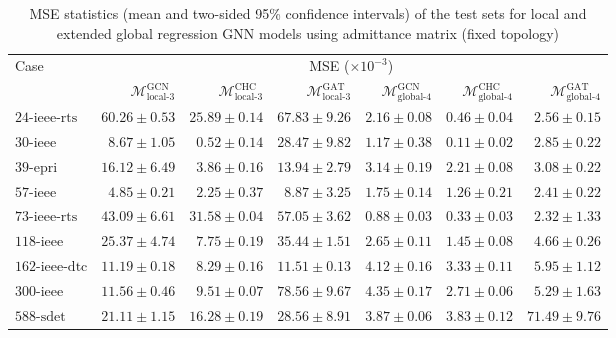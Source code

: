 \documentclass[journal]{IEEEtran}
\begin{document}
\begin{table*}[!ht]
\small
\caption{MSE statistics (mean and two-sided 95\% confidence intervals) of the test sets for local and extended global regression GNN models using admittance matrix (fixed topology)}
\label{tab:error_reg_local_admittance}
\def\na{---}
\centering
    \begin{tabular}{lrrr|rrr}
    \toprule
    \multirow{2}{*}{Case} & \multicolumn{6}{c}{MSE ($\times 10^{-3}$)} \\
    \cmidrule(r){2-7}
    & $\mathcal{M}^{\textrm{GCN}}_{\textrm{local-3}}$ & $\mathcal{M}^{\textrm{CHC}}_{\textrm{local-3}}$ & $\mathcal{M}^{\textrm{GAT}}_{\textrm{local-3}}$ & $\mathcal{M}^{\textrm{GCN}}_{\textrm{global-4}}$ & $\mathcal{M}^{\textrm{CHC}}_{\textrm{global-4}}$ & $\mathcal{M}^{\textrm{GAT}}_{\textrm{global-4}}$ \\
    \midrule
    $\textrm{24-ieee-rts}$ & $60.26 \pm 0.53$ & $25.89 \pm 0.14$ & $67.83 \pm 9.26$ & $2.16 \pm 0.08$ & $0.46 \pm 0.04$ & $2.56 \pm 0.15$ \\
    $\textrm{30-ieee}$ & $8.67 \pm 1.05$ & $0.52 \pm 0.14$ & $28.47 \pm 9.82$ & $1.17 \pm 0.38$ & $0.11 \pm 0.02$ & $2.85 \pm 0.22$ \\
    $\textrm{39-epri}$ &$16.12 \pm 6.49$ & $3.86 \pm 0.16$ & $13.94 \pm 2.79$ & $3.14 \pm 0.19$ & $2.21 \pm 0.08$ & $3.08 \pm 0.22$ \\
    $\textrm{57-ieee}$ & $4.85 \pm 0.21$ & $2.25 \pm 0.37$ & $8.87 \pm 3.25$ & $1.75 \pm 0.14$ & $1.26 \pm 0.21$ & $2.41 \pm 0.22$ \\
    $\textrm{73-ieee-rts}$ & $43.09 \pm 6.61$ & $31.58 \pm 0.04$ & $57.05 \pm 3.62$ & $0.88 \pm 0.03$ & $0.33 \pm 0.03$ & $2.32 \pm 1.33$ \\
    $\textrm{118-ieee}$ & $25.37 \pm 4.74$ & $7.75 \pm 0.19$ & $35.44 \pm 1.51$ & $2.65 \pm 0.11$ & $1.45 \pm 0.08$ & $4.66 \pm 0.26$\\
    $\textrm{162-ieee-dtc}$ & $11.19 \pm 0.18$ & $8.29 \pm 0.16$ & $11.51 \pm 0.13$ & $4.12 \pm 0.16$ & $3.33 \pm 0.11$ & $5.95 \pm 1.12$ \\
    $\textrm{300-ieee}$ & $11.56 \pm 0.46$ & $9.51 \pm 0.07$ & $78.56 \pm 9.67$ & $4.35 \pm 0.17$ & $2.71 \pm 0.06$ & $5.29 \pm 1.63$ \\
    $\textrm{588-sdet}$ & $21.11 \pm 1.15$ & $16.28 \pm 0.19$ & $28.56 \pm 8.91$ & $3.87 \pm 0.06$ & $3.83 \pm 0.12$ & $71.49 \pm 9.76$ \\
    \bottomrule
    \end{tabular}
\end{table*}
\end{document}
